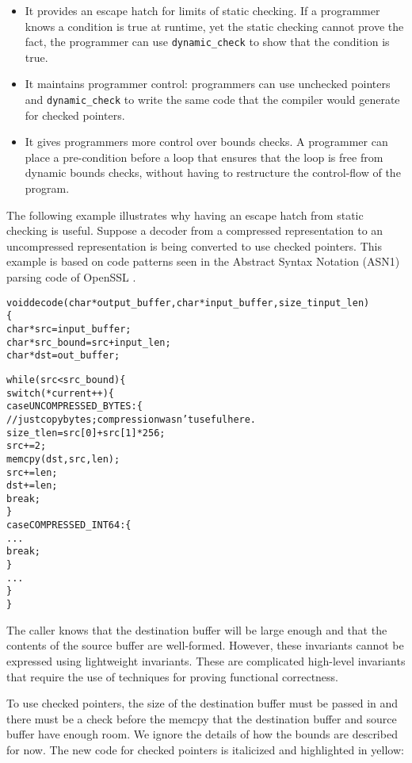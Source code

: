 \begin{itemize}
\item
  It provides an escape hatch for limits of static checking. If a
  programmer knows a condition is true at runtime, yet the static
  checking cannot prove the fact, the programmer can use
  \texttt{dynamic\_check} to show that the condition is true.
\item
  It maintains programmer control: programmers can use unchecked pointers
  and \texttt{dynamic\_check} to write the same code that the compiler
  would generate for checked pointers.
\item
  It gives programmers more control over bounds checks. A programmer can
  place a pre-condition before a loop that ensures that the loop is free
  from dynamic bounds checks, without having to restructure the
  control-flow of the program.
\end{itemize}

The following example illustrates why having an escape hatch from static
checking is useful. Suppose a decoder from a compressed representation
to an uncompressed representation is being converted to use checked
pointers. This example is based on code patterns seen in the Abstract
Syntax Notation (ASN1) parsing code of OpenSSL \cite{OpenSSL2015}.

\begin{alltt}
void decode(char *output\_buffer, char *input\_buffer, size\_t input\_len)
\{
    char *src = input\_buffer;
    char *src\_bound = src + input\_len;
    char *dst = out\_buffer;

    while (src < src\_bound) \{
        switch (*current++) \{
            case UNCOMPRESSED\_BYTES: \{ 
                // just copy bytes; compression wasn't useful here.
                size_t len = src[0] + src[1]*256;
                src += 2;
                memcpy(dst, src, len);
                src += len;
                dst += len;
                break;
            \}
            case COMPRESSED\_INT64: \{
                ...
                break;
            \}
        ...
    \}
\}
\end{alltt}

The caller knows that the destination buffer will be large enough and
that the contents of the source buffer are well-formed. However, these
invariants cannot be expressed using lightweight invariants. These are
complicated high-level invariants that require the use of techniques for
proving functional correctness.

To use checked pointers, the size of the destination buffer must be passed
in and there must be a check before the memcpy that the destination
buffer and source buffer have enough room. We ignore the details of how
the bounds are described for now.    The new code for checked pointers is italicized
and highlighted in yellow:

